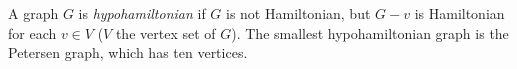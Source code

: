 \documentclass[12pt]{article}
\begin{document}
A graph $G$ is \emph{hypohamiltonian} if $G$ is not Hamiltonian, but $G - v$ is Hamiltonian for each $v \in V$ ($V$ the vertex set of $G$). The smallest hypohamiltonian graph is the Petersen graph, which has ten vertices.
\end{document}
